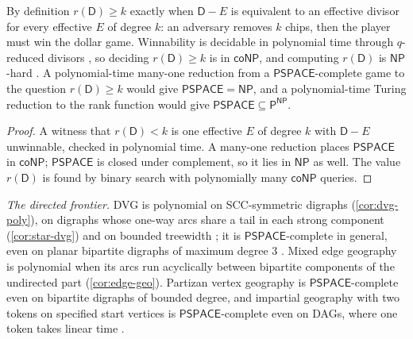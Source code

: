 \documentclass[final]{siamart0516}
\numberwithin{theorem}{section}
\numberwithin{equation}{section}
\theoremstyle{siamnonum}
\theoremstyle{plain}
\newcommand{\Dv}{\mathsf{D}}              %
\newcommand{\cls}[1]{\mathsf{#1}}
\newcommand{\PSPACE}{\cls{PSPACE}}
\newcommand{\NP}{\cls{NP}}
\newcommand{\coNP}{\cls{coNP}}
\newcommand{\Pclass}{\cls{P}}
\begin{document}
\begin{proposition}\label{prop:rank-game}
By definition $r(\Dv)\ge k$ exactly when $\Dv-E$ is equivalent to an effective divisor for every effective $E$ of degree $k$: an adversary removes $k$ chips, then the player must win the dollar game. Winnability is decidable in polynomial time through $q$-reduced divisors \cite{BakerNorine,BakerShokrieh}, so deciding $r(\Dv)\ge k$ is in $\coNP$, and computing $r(\Dv)$ is $\NP$-hard \cite{KissToth}. A polynomial-time many-one reduction from a $\PSPACE$-complete game to the question $r(\Dv)\ge k$ would give $\PSPACE=\NP$, and a polynomial-time Turing reduction to the rank function would give $\PSPACE\subseteq\Pclass^{\NP}$.
\end{proposition}
\begin{proof}
A witness that $r(\Dv)<k$ is one effective $E$ of degree $k$ with $\Dv-E$ unwinnable, checked in polynomial time. A many-one reduction places $\PSPACE$ in $\coNP$; $\PSPACE$ is closed under complement, so it lies in $\NP$ as well. The value $r(\Dv)$ is found by binary search with polynomially many $\coNP$ queries.
\end{proof}

\noindent\emph{The directed frontier.} DVG is polynomial on SCC-symmetric digraphs (\cref{cor:dvg-poly}), on digraphs whose one-way arcs share a tail in each strong component (\cref{cor:star-dvg}) and on bounded treewidth \cite{Bodlaender}; it is $\PSPACE$-complete in general, even on planar bipartite digraphs of maximum degree $3$ \cite{LichtensteinSipser}. Mixed edge geography is polynomial when its arcs run acyclically between bipartite components of the undirected part (\cref{cor:edge-geo}). Partizan vertex geography is $\PSPACE$-complete even on bipartite digraphs of bounded degree, and impartial geography with two tokens on specified start vertices is $\PSPACE$-complete even on DAGs, where one token takes linear time \cite{FraenkelSimonson}.
\end{document}
